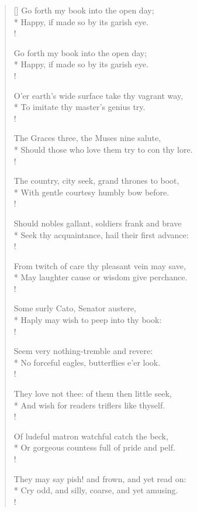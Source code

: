 \begin{verse}[\versewidth]
Go forth my book into the open day;\\*
Happy, if made so by its garish eye. \\!

Go forth my book into the open day;\\*
Happy, if made so by its garish eye. \\!

O'er earth's wide surface take thy vagrant way,\\*
To imitate thy master's genius try. \\!

The Graces three, the Muses nine salute,\\*
Should those who love them try to con thy lore.\\!

The country, city seek, grand thrones to boot,\\*
With gentle courtesy humbly bow before.\\!

Should nobles gallant, soldiers frank and brave\\*
Seek thy acquaintance, hail their first advance:\\!

From twitch of care thy pleasant vein may save,\\*
May laughter cause or wisdom give perchance.\\!

Some surly Cato, Senator austere,\\*
Haply may wish to peep into thy book:\\!

Seem very nothing-tremble and revere:\\*
No forceful eagles, butterflies e'er look.\\!

They love not thee: of them then little seek,\\*
And wish for readers triflers like thyself.\\!

Of ludeful matron watchful catch the beck,\\*
Or gorgeous countess full of pride and pelf.\\!

They may say pish! and frown, and yet read on:\\*
Cry odd, and silly, coarse, and yet amusing.\\!


\end{verse}
